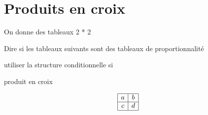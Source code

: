 \documentclass{article}
\begin{document}
\section{Produits en croix}

On donne des tableaux 2 * 2

Dire si les tableaux suivants sont des tableaux de proportionnalité

utiliser la structure conditionnelle si

produit en croix

\begin{equation*}
  \begin{array}{|c|c|}
    \hline
    a & b \\
    \hline
    c & d \\
    \hline
  \end{array}
\end{equation*}
\end{document}

